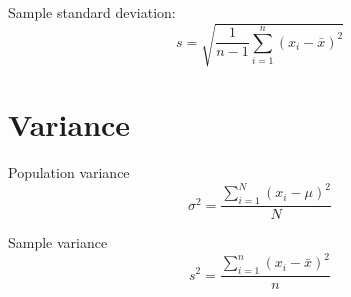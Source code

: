 \documentclass{article}
\begin{document}
Sample standard deviation:
\[
s = \sqrt{\frac{1}{n-1} \sum_{i=1}^n (x_i - \bar{x})^2}
\]
\hspace{0.5cm}

\section*{Variance}


\hspace{0.5cm}

Population variance
\[
\sigma^2 = \frac{\displaystyle\sum_{i=1}^{N}(x_i - \mu)^2} {N}
\]

Sample variance
\[
s^2 = \frac{\displaystyle\sum_{i=1}^{n}(x_i - \bar{x})^2} {n}

\]
\end{document}
